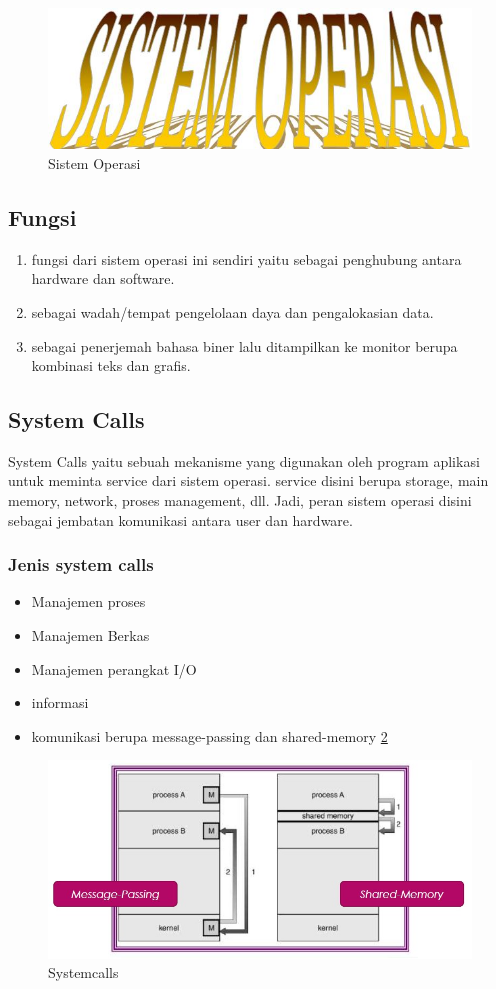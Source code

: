 	\begin{figure}[ht]
		\centerline{\includegraphics[width=1\textwidth]{figures/OS.JPG}}
		\caption{Sistem Operasi}
		\label{OS}
	\end{figure}
	
	\subsection{Fungsi}
	\begin{enumerate}
		\item fungsi dari sistem operasi ini sendiri yaitu sebagai penghubung antara hardware dan software.
		\item sebagai wadah/tempat pengelolaan daya dan pengalokasian data.
		\item sebagai penerjemah bahasa biner lalu ditampilkan ke monitor berupa kombinasi teks dan grafis.
		\end{enumerate}
\subsection{System Calls}
System Calls yaitu sebuah mekanisme yang digunakan oleh program aplikasi untuk meminta service dari sistem operasi. service disini berupa storage, main memory, network, proses management, dll. Jadi, peran sistem operasi disini sebagai jembatan komunikasi antara user dan hardware.
\subsubsection{Jenis system calls}
\begin{itemize}
\item Manajemen proses
\item Manajemen Berkas
\item Manajemen perangkat I/O
\item informasi
\item komunikasi berupa message-passing dan shared-memory \ref{SC}
\end{itemize}
\begin{figure}[ht]
		\centerline{\includegraphics[width=1\textwidth]{figures/message-parsing.JPG}}
		\caption{Systemcalls}
		\label{SC}
	\end{figure}
